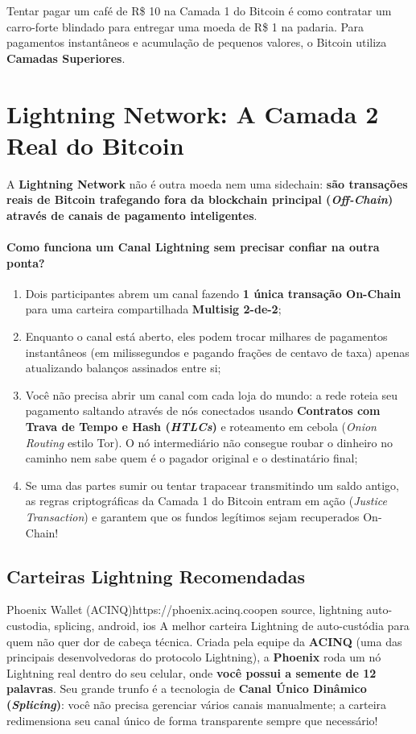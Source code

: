\documentclass{pousadaguide}
\begin{document}
Tentar pagar um café de R\$ 10 na Camada 1 do Bitcoin é como contratar um carro-forte blindado para entregar uma moeda de R\$ 1 na padaria. Para pagamentos instantâneos e acumulação de pequenos valores, o Bitcoin utiliza \textbf{Camadas Superiores}.

\section{Lightning Network: A Camada 2 Real do Bitcoin}

A \textbf{Lightning Network} não é outra moeda nem uma sidechain: \textbf{são transações reais de Bitcoin trafegando fora da blockchain principal (\emph{Off-Chain}) através de canais de pagamento inteligentes}.

\paragraph{Como funciona um Canal Lightning sem precisar confiar na outra ponta?}
\begin{enumerate}
  \item Dois participantes abrem um canal fazendo \textbf{1 única transação On-Chain} para uma carteira compartilhada \textbf{Multisig 2-de-2};
  \item Enquanto o canal está aberto, eles podem trocar milhares de pagamentos instantâneos (em milissegundos e pagando frações de centavo de taxa) apenas atualizando balanços assinados entre si;
  \item Você não precisa abrir um canal com cada loja do mundo: a rede roteia seu pagamento saltando através de nós conectados usando \textbf{Contratos com Trava de Tempo e Hash (\emph{HTLCs})} e roteamento em cebola (\emph{Onion Routing} estilo Tor). O nó intermediário não consegue roubar o dinheiro no caminho nem sabe quem é o pagador original e o destinatário final;
  \item Se uma das partes sumir ou tentar trapacear transmitindo um saldo antigo, as regras criptográficas da Camada 1 do Bitcoin entram em ação (\emph{Justice Transaction}) e garantem que os fundos legítimos sejam recuperados On-Chain!
\end{enumerate}

\subsection{Carteiras Lightning Recomendadas}

\begin{ferramenta}[goat,logo=phoenix]{Phoenix Wallet (ACINQ)}{https://phoenix.acinq.co}{open source, lightning auto-custodia, splicing, android, ios}
A melhor carteira Lightning de auto-custódia para quem não quer dor de cabeça técnica. Criada pela equipe da \textbf{ACINQ} (uma das principais desenvolvedoras do protocolo Lightning), a \textbf{Phoenix} roda um nó Lightning real dentro do seu celular, onde \textbf{você possui a semente de 12 palavras}. Seu grande trunfo é a tecnologia de \textbf{Canal Único Dinâmico (\emph{Splicing})}: você não precisa gerenciar vários canais manualmente; a carteira redimensiona seu canal único de forma transparente sempre que necessário! 
\end{ferramenta}
\end{document}
